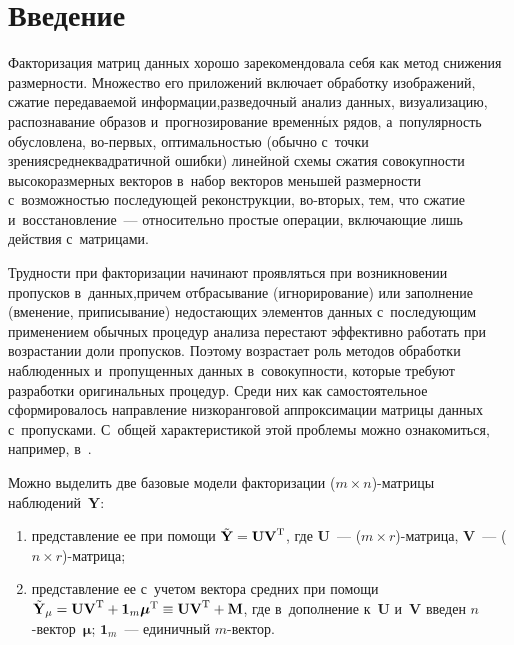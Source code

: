 \vspace*{-6pt}



\thispagestyle{headings}

\begin{multicols}{2}

\label{st\stat}
  
\section{Введение}

     Факторизация матриц данных хорошо зарекомендовала себя как метод 
снижения размерности. Множество его приложений включает обработку 
изображений, сжатие передаваемой информации,\linebreak разведочный анализ данных, 
визуализацию, распознавание образов и~прогнозирование вре\-мен\-н$\acute{\mbox{ы}}$х рядов, 
а~популярность обусловлена, во-пер\-вых, оптимальностью (обычно с~точки 
зрения\linebreak среднеквад\-ра\-тич\-ной ошибки) линейной схемы сжатия совокупности  
вы\-со\-ко\-раз\-мер\-ных векторов в~набор векторов меньшей размерности 
с~возможностью последующей реконструкции, во-вто\-рых, тем, что сжатие 
и~восстановление~--- относительно простые операции, включающие лишь 
действия с~мат\-ри\-цами.
     
     Трудности при факторизации начинают проявляться при возникновении 
пропусков в~данных,\linebreak причем отбрасывание (игнорирование) или заполнение 
(вменение, приписывание) не\-до\-ста\-ющих элементов данных с~последующим 
применением обычных процедур анализа перестают эффективно работать при 
возрастании доли пропусков. Поэтому возрастает роль методов обработки 
наблюденных и~пропущенных данных в~со\-во\-куп\-ности, которые требуют 
разработки оригинальных процедур.
     Среди них как самостоятельное сформировалось направление низкоранговой аппроксимации мат\-ри\-цы данных с~пропусками. С~общей 
характеристикой этой проб\-ле\-мы можно ознакомиться, например, в~\cite{1-kri}. 
     
     Можно выделить две базовые модели факторизации  
($m\times n$)-мат\-ри\-цы наблюдений~$\mathbf{Y}$:
     \begin{enumerate}[(1)]
\item представление ее при помощи $\tilde{\mathbf{Y}}\hm= \mathbf{UV}^{\mathrm{T}}$, 
где $\mathbf{U}$~--- ($m\times r$)-мат\-ри\-ца, $\mathbf{V}$~--- ($n\times r$)-мат\-рица;
\item представление ее с~учетом вектора средних при помощи 
$\tilde{\mathbf{Y}}_\mu\hm=\mathbf{UV}^{\mathrm{T}}\hm+\mathbf{1}_m\bm{\mu}^{\mathrm{T}}\hm\equiv \mathbf{UV}^{\mathrm{T}}\hm+\mathbf{M}$, где 
в~дополнение к~$\mathbf{U}$ и~$\mathbf{V}$ введен $n$-век\-тор~$\bm{\mu}$; 
$\mathbf{1}_m$~--- единичный $m$-век\-тор.
\end{enumerate}


\end{multicols}
